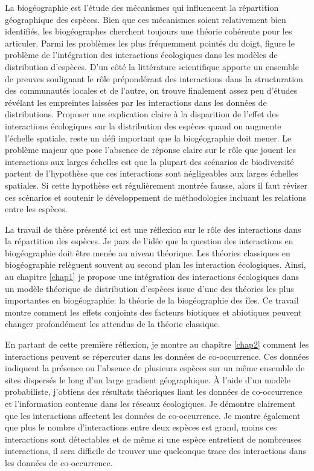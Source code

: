 La biogéographie est l'étude des mécanismes qui influencent la
répartition géographique des espèces. Bien que ces mécanismes soient
relativement bien identifiés, les biogéographes cherchent toujours une
théorie cohérente pour les articuler. Parmi les problèmes les plus
fréquemment pointés du doigt, figure le problème de l'intégration des
interactions écologiques dans les modèles de distribution d'espèces.
D'un côté la littérature scientifique apporte un ensemble de preuves
soulignant le rôle prépondérant des interactions dans la structuration
des communautés locales et de l'autre, on trouve finalement assez peu
d'études révélant les empreintes laissées par les interactions dans les
données de distributions. Proposer une explication claire à la
disparition de l'effet des interactions écologiques sur la distribution
des espèces quand on augmente l'échelle spatiale, reste un défi
important que la biogéographie doit mener. Le problème majeur que pose
l'absence de réponse claire sur le rôle que jouent les interactions aux
larges échelles est que la plupart des scénarios de biodiversité partent
de l'hypothèse que ces interactions sont négligeables aux larges
échelles spatiales. Si cette hypothèse est régulièrement montrée fausse,
alors il faut réviser ces scénarios et soutenir le développement de
méthodologies incluant les relations entre les espèces.

La travail de thèse présenté ici est une réflexion sur le rôle des
interactions dans la répartition des espèces. Je pars de l'idée que la
question des interactions en biogéographie doit être menée au niveau
théorique. Les théories classiques en biogéographie relèguent souvent au
second plan les interaction écologiques. Ainsi, au chapitre \ref{chap1}
je propose une intégration des interactions écologiques dans un modèle
théorique de distribution d'espèces issue d'une des théories les plus
importantes en biogéographie: la théorie de la biogéographie des îles.
Ce travail montre comment les effets conjoints des facteurs biotiques et
abiotiques peuvent changer profondément les attendus de la théorie
classique.

En partant de cette première réflexion, je montre au chapitre
\ref{chap2} comment les interactions peuvent se répercuter dans les
données de co-occurrence. Ces données indiquent la présence ou l'absence
de plusieurs espèces sur un même ensemble de sites dispersés le long
d'un large gradient géographique. À l'aide d'un modèle probabiliste,
j'obtiens des résultats théoriques liant les données de co-occurrence et
l'information contenue dans les réseaux écologiques. Je démontre
clairement que les interactions affectent les données de co-occurrence.
Je montre également que plus le nombre d'interactions entre deux espèces
est grand, moins ces interactions sont détectables et de même si une
espèce entretient de nombreuses interactions, il sera difficile de
trouver une quelconque trace des interactions dans les données de
co-occurrence.

